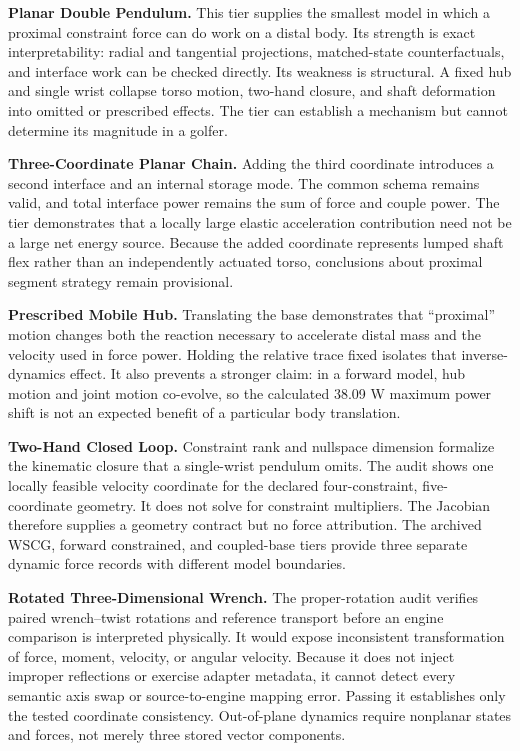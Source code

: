 \documentclass[
  letterpaper,
]{report}
\begin{document}
\textbf{Planar Double Pendulum.} This tier supplies the smallest model
in which a proximal constraint force can do work on a distal body. Its
strength is exact interpretability: radial and tangential projections,
matched-state counterfactuals, and interface work can be checked
directly. Its weakness is structural. A fixed hub and single wrist
collapse torso motion, two-hand closure, and shaft deformation into
omitted or prescribed effects. The tier can establish a mechanism but
cannot determine its magnitude in a golfer.

\textbf{Three-Coordinate Planar Chain.} Adding the third coordinate
introduces a second interface and an internal storage mode. The common
schema remains valid, and total interface power remains the sum of force
and couple power. The tier demonstrates that a locally large elastic
acceleration contribution need not be a large net energy source. Because
the added coordinate represents lumped shaft flex rather than an
independently actuated torso, conclusions about proximal segment
strategy remain provisional.

\textbf{Prescribed Mobile Hub.} Translating the base demonstrates that
``proximal'' motion changes both the reaction necessary to accelerate
distal mass and the velocity used in force power. Holding the relative
trace fixed isolates that inverse-dynamics effect. It also prevents a
stronger claim: in a forward model, hub motion and joint motion
co-evolve, so the calculated 38.09 W maximum power shift is not an
expected benefit of a particular body translation.

\textbf{Two-Hand Closed Loop.} Constraint rank and nullspace dimension
formalize the kinematic closure that a single-wrist pendulum omits. The
audit shows one locally feasible velocity coordinate for the declared
four-constraint, five-coordinate geometry. It does not solve for
constraint multipliers. The Jacobian therefore supplies a geometry
contract but no force attribution. The archived WSCG, forward
constrained, and coupled-base tiers provide three separate dynamic force
records with different model boundaries.

\textbf{Rotated Three-Dimensional Wrench.} The proper-rotation audit
verifies paired wrench--twist rotations and reference transport before
an engine comparison is interpreted physically. It would expose
inconsistent transformation of force, moment, velocity, or angular
velocity. Because it does not inject improper reflections or exercise
adapter metadata, it cannot detect every semantic axis swap or
source-to-engine mapping error. Passing it establishes only the tested
coordinate consistency. Out-of-plane dynamics require nonplanar states
and forces, not merely three stored vector components.
\end{document}
